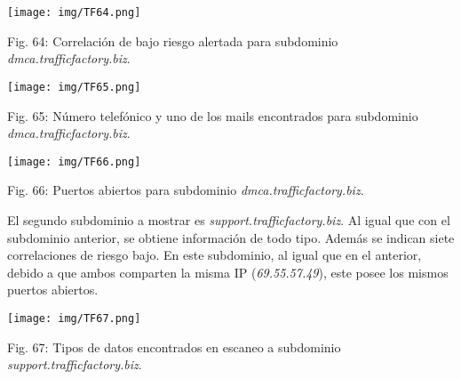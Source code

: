 \documentclass[12pt,oneside,a4paper]{book}
\begin{document}
\vspace{2em}

\begin{center}
	\texttt{[image: img/TF64.png]}
    
\vspace{0.1em}
    
    Fig. 64: Correlación de bajo riesgo alertada para subdominio \textit{dmca.trafficfactory.biz}.
\end{center}

\vspace{2em}

\begin{center}
	\texttt{[image: img/TF65.png]}
    
\vspace{0.1em}
    
    Fig. 65: Número telefónico y uno de los mails encontrados para subdominio \textit{dmca.trafficfactory.biz}.
\end{center}

\vspace{2em}

\begin{center}
	\texttt{[image: img/TF66.png]}
    
\vspace{0.1em}
    
    Fig. 66: Puertos abiertos para subdominio \textit{dmca.trafficfactory.biz}.
\end{center}

\vspace{2em}

\hspace{20pt}
El segundo subdominio a mostrar es \textit{support.trafficfactory.biz}. Al igual que con el subdominio anterior, se obtiene información de todo tipo. Además se indican siete correlaciones de riesgo bajo. En este subdominio, al igual que en el anterior, debido a que ambos comparten la misma IP (\textit{69.55.57.49}), este posee los mismos puertos abiertos.

\vspace{2em}

\begin{center}
	\texttt{[image: img/TF67.png]}
    
\vspace{0.1em}
    
    Fig. 67: Tipos de datos encontrados en escaneo a subdominio \textit{support.trafficfactory.biz}.
\end{center}
\end{document}
